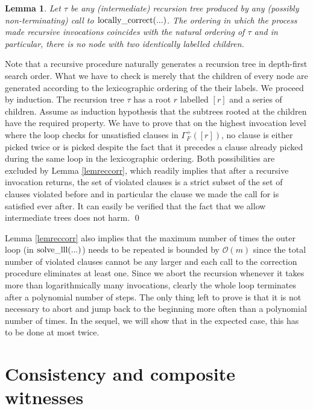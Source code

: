 \documentclass[11pt,a4paper]{article}
\newtheorem{lemma}[theorem]{Lemma}
\newcommand{\prbl}{\vspace*{0.2cm}}
\newcommand{\Function}[2]
	{ \mbox{\rm #1}(#2)}
\begin{document}
\begin{lemma}
\label{lemrecord}
Let $\tau$ be any (intermediate) recursion tree produced by any (possibly non-terminating) call to 
$\Function{locally\_correct}{...}$. The ordering in which the process made recursive invocations
coincides with the natural ordering of $\tau$ and in particular, there is no node with two identically
labelled children.
\end{lemma}

\proof Note that a recursive procedure naturally generates a recursion tree in depth-first search
order. What we have to check is merely that the children of every node are generated according to
the lexicographic ordering of the their labels. We proceed by induction. The recursion tree 
$\tau$ has a root $r$ labelled $[r]$ and a series of children. Assume as induction hypothesis 
that the subtrees rooted at the children have the required property. We have to prove that on the 
highest invocation level where the loop checks for unsatisfied clauses in $\Gamma_F^+([r])$, no clause 
is either picked twice or is picked despite the fact that it precedes a clause already picked during
the same loop in the lexicographic ordering. Both possibilities are excluded by Lemma \ref{lemreccorr},
which readily implies that after a recursive invocation returns, the set of violated clauses is a strict
subset of the set of clauses violated before and in particular the clause we made the call for is satisfied
ever after. It can easily be verified that the fact that we allow intermediate trees does not harm.
\qed
\prbl

Lemma \ref{lemreccorr} also implies that the maximum number of times the outer loop 
(in $\Function{solve\_lll}{...}$) needs to be repeated is bounded by $\mathcal{O}(m)$ since
the total number of violated clauses cannot be any larger and each call to the correction
procedure eliminates at least one. Since we abort the recursion whenever it takes more
than logarithmically many invocations, clearly the whole loop terminates after a polynomial
number of steps. The only thing left to prove is that it is not necessary to abort and
jump back to the beginning more often than a polynomial number of times. In the sequel, we
will show that in the expected case, this has to be done at most twice.

\vspace*{-0.3cm}
\section{Consistency and composite witnesses}
\end{document}
